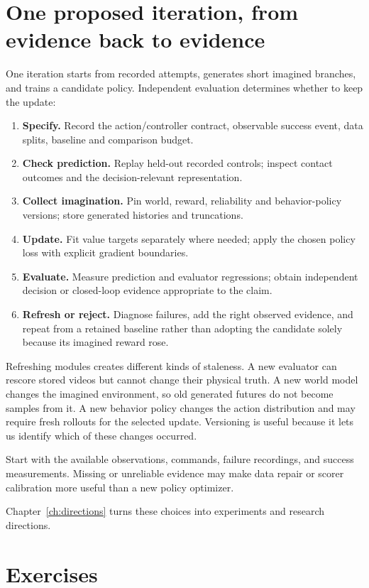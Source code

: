 \section{One proposed iteration, from evidence back to evidence}
One iteration starts from recorded attempts, generates short imagined branches, and trains a candidate policy. Independent evaluation determines whether to keep the update:

\begin{enumerate}[leftmargin=*,itemsep=3pt]
\item \textbf{Specify.} Record the action/controller contract, observable success event, data splits, baseline and comparison budget.
\item \textbf{Check prediction.} Replay held-out recorded controls; inspect contact outcomes and the decision-relevant representation.
\item \textbf{Collect imagination.} Pin world, reward, reliability and behavior-policy versions; store generated histories and truncations.
\item \textbf{Update.} Fit value targets separately where needed; apply the chosen policy loss with explicit gradient boundaries.
\item \textbf{Evaluate.} Measure prediction and evaluator regressions; obtain independent decision or closed-loop evidence appropriate to the claim.
\item \textbf{Refresh or reject.} Diagnose failures, add the right observed evidence, and repeat from a retained baseline rather than adopting the candidate solely because its imagined reward rose.
\end{enumerate}

Refreshing modules creates different kinds of staleness. A new evaluator can rescore stored videos but cannot change their physical truth. A new world model changes the imagined environment, so old generated futures do not become samples from it. A new behavior policy changes the action distribution and may require fresh rollouts for the selected update. Versioning is useful because it lets us identify which of these changes occurred.

Start with the available observations, commands, failure recordings, and success measurements. Missing or unreliable evidence may make data repair or scorer calibration more useful than a new policy optimizer.

Chapter~\ref{ch:directions} turns these choices into experiments and research directions.
\FloatBarrier

\section{Exercises}
\FloatBarrier
